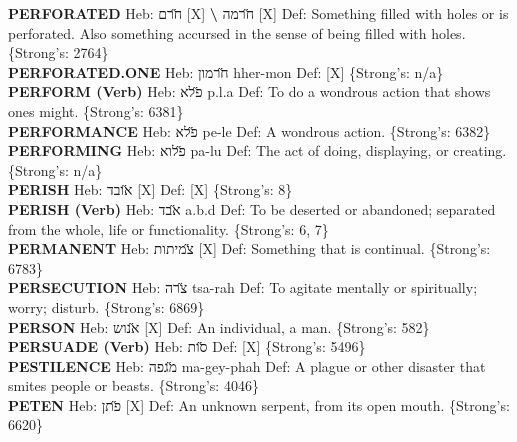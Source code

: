 {\textbf{PERFORATED} Heb: {\large\H חרם} {[}X{]} \textbf{\textbackslash{}} {\large\H חרמה} {[}X{]} Def: Something filled with holes or is perforated. Also something accursed in the sense of being filled with holes. \{Strong's: 2764\}\hfill{}\\

\textbf{PERFORATED.ONE} Heb: {\large\H חרמון} hher-mon Def: {[}X{]} \{Strong's: n/a\}\hfill{}\\

\textbf{PERFORM (Verb)} Heb: {\large\H פלא} p.l.a Def: To do a wondrous action that shows ones might. \{Strong's: 6381\}\hfill{}\\

\textbf{PERFORMANCE} Heb: {\large\H פלא} pe-le Def: A wondrous action. \{Strong's: 6382\}\hfill{}\\

\textbf{PERFORMING} Heb: {\large\H פלוא} pa-lu Def: The act of doing, displaying, or creating. \{Strong's: n/a\}\hfill{}\\

\textbf{PERISH} Heb: {\large\H אובד} {[}X{]} Def: {[}X{]} \{Strong's: 8\}\hfill{}\\

\textbf{PERISH (Verb)} Heb: {\large\H אבד} a.b.d Def: To be deserted or abandoned; separated from the whole, life or functionality. \{Strong's: 6, 7\}\hfill{}\\

\textbf{PERMANENT} Heb: {\large\H צמיתות} {[}X{]} Def: Something that is continual. \{Strong's: 6783\}\hfill{}\\

\textbf{PERSECUTION} Heb: {\large\H צרה} tsa-rah Def: To agitate mentally or spiritually; worry; disturb. \{Strong's: 6869\}\hfill{}\\

\textbf{PERSON} Heb: {\large\H אנוש} {[}X{]} Def: An individual, a man. \{Strong's: 582\}\hfill{}\\

\textbf{PERSUADE (Verb)} Heb: {\large\H סות} Def: {[}X{]} \{Strong's: 5496\}\hfill{}\\

\textbf{PESTILENCE} Heb: {\large\H מגפה} ma-gey-phah Def: A plague or other disaster that smites people or beasts. \{Strong's: 4046\}\hfill{}\\

\textbf{PETEN} Heb: {\large\H פתן} {[}X{]} Def: An unknown serpent, from its open mouth. \{Strong's: 6620\}\hfill{}\\

}
